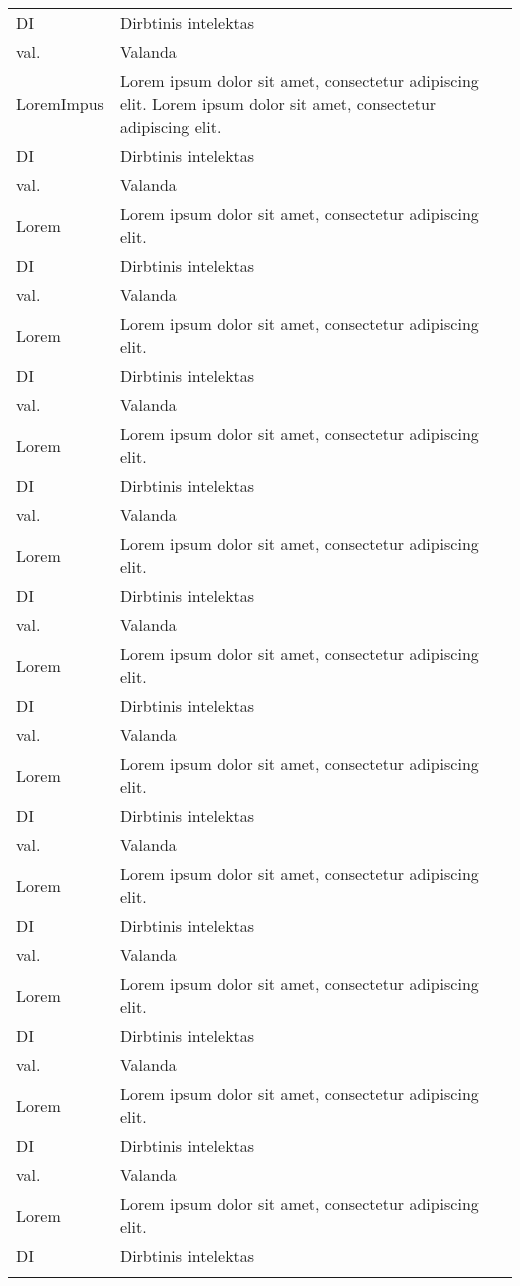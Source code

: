 \noindent
 \begin{longtable}[l]{ p{3cm} p{8cm} } %
        DI    & Dirbtinis intelektas\\ 
        val.  & Valanda\\ 
        LoremImpus & Lorem ipsum dolor sit amet, consectetur adipiscing elit. Lorem ipsum dolor sit amet, consectetur adipiscing elit.\\
        DI    & Dirbtinis intelektas\\ 
        val.  & Valanda\\ 
        Lorem & Lorem ipsum dolor sit amet, consectetur adipiscing elit.\\
        DI    & Dirbtinis intelektas\\ 
        val.  & Valanda\\ 
        Lorem & Lorem ipsum dolor sit amet, consectetur adipiscing elit.\\
        DI    & Dirbtinis intelektas\\ 
        val.  & Valanda\\ 
        Lorem & Lorem ipsum dolor sit amet, consectetur adipiscing elit.\\
        DI    & Dirbtinis intelektas\\ 
        val.  & Valanda\\ 
        Lorem & Lorem ipsum dolor sit amet, consectetur adipiscing elit.\\
        DI    & Dirbtinis intelektas\\ 
        val.  & Valanda\\ 
        Lorem & Lorem ipsum dolor sit amet, consectetur adipiscing elit.\\
        DI    & Dirbtinis intelektas\\ 
        val.  & Valanda\\ 
        Lorem & Lorem ipsum dolor sit amet, consectetur adipiscing elit.\\
        DI    & Dirbtinis intelektas\\ 
        val.  & Valanda\\ 
        Lorem & Lorem ipsum dolor sit amet, consectetur adipiscing elit.\\
        DI    & Dirbtinis intelektas\\ 
        val.  & Valanda\\ 
        Lorem & Lorem ipsum dolor sit amet, consectetur adipiscing elit.\\
        DI    & Dirbtinis intelektas\\ 
        val.  & Valanda\\ 
        Lorem & Lorem ipsum dolor sit amet, consectetur adipiscing elit.\\
        DI    & Dirbtinis intelektas\\ 
        val.  & Valanda\\ 
        Lorem & Lorem ipsum dolor sit amet, consectetur adipiscing elit.\\
        DI    & Dirbtinis intelektas\\ 
    \label{tab:acronyms}
\end{longtable}
